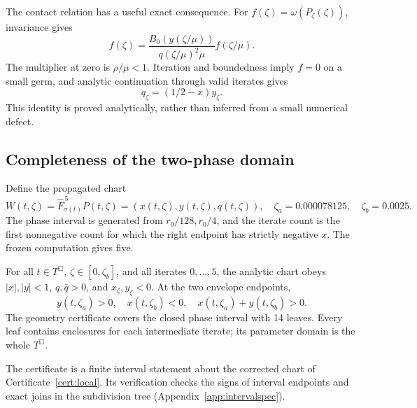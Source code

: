 The contact relation has a useful exact consequence. For
\(f(\zeta)=\omega(P_\zeta(\zeta))\), invariance gives
\[
 f(\zeta)=\frac{B_0(y(\zeta/\mu))}{q(\zeta/\mu)^2\mu}
                f(\zeta/\mu).
\]
The multiplier at zero is \(\rho/\mu<1\). Iteration and boundedness imply
\(f=0\) on a small germ, and analytic continuation through valid iterates
gives
\begin{equation}\label{eq:contacttangent}
 q_\zeta=(1/2-x)y_\zeta.
\end{equation}
This identity is proved analytically, rather than inferred from a small
numerical defect.

\subsection{Completeness of the two-phase domain}
Define the propagated chart
\begin{equation}\label{eq:W}
 W(t,\zeta)=\widehat F_{\sigma(t)}^{\,5}P(t,\zeta)
             =(x(t,\zeta),y(t,\zeta),q(t,\zeta)),
 \quad
 \zeta_a=0.000078125,\quad \zeta_b=0.0025.
\end{equation}
The phase interval is generated from \(r_0/128,r_0/4\), and the iterate
count is the first nonnegative count for which the right endpoint has
strictly negative \(x\). The frozen computation gives five.

\begin{certificate}\label{cert:geometry}
For all \(t\in T^\Box\), \(\zeta\in[0,\zeta_b]\), and all iterates
\(0,\ldots,5\), the analytic chart obeys \(|x|,|y|<1\),
\(q,\bar q>0\), and \(x_\zeta,y_\zeta<0\). At the two envelope endpoints,
\[
 y(t,\zeta_a)>0,\quad x(t,\zeta_b)<0,\quad
 x(t,\zeta_a)+y(t,\zeta_b)>0.
\]
The geometry certificate covers the closed phase interval with 14 leaves.
Every leaf contains enclosures for each intermediate iterate; its parameter
domain is the whole \(T^\Box\).
\end{certificate}
The certificate is a finite interval statement about the corrected chart
of Certificate~\ref{cert:local}. Its verification checks the signs of
interval endpoints and exact joins in the subdivision tree
(Appendix~\ref{app:intervalspec}).

